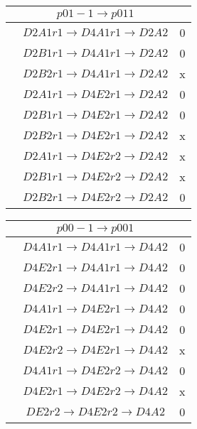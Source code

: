 \documentclass[10pt]{article}
\begin{document}
\begin{table}[!htbp]
\begin{minipage}{0.33\textwidth}
\begin{tabular}{cc c}
\hline

 &$p01-1 \rightarrow p011 $ \\ \hline
 & $D2A1 r1 \rightarrow D4A1 r1 \rightarrow D2A2$ & 0\\
 & $D2B1 r1 \rightarrow D4A1 r1 \rightarrow D2A2$ &  0\\
 & $D2B2 r1 \rightarrow D4A1 r1 \rightarrow D2A2$ &  x\\
 & $D2A1 r1 \rightarrow D4E2 r1 \rightarrow D2A2$ &  0\\
 & $D2B1 r1 \rightarrow D4E2 r1 \rightarrow D2A2$ &  0\\
 & $D2B2 r1 \rightarrow D4E2 r1 \rightarrow D2A2$ &  x\\
 & $D2A1 r1 \rightarrow D4E2 r2 \rightarrow D2A2$ &  x\\
 & $D2B1 r1 \rightarrow D4E2 r2 \rightarrow D2A2$ &  x\\
 & $D2B2 r1 \rightarrow D4E2 r2 \rightarrow D2A2$ &  0\\

\hline

\end{tabular}
\end{minipage}
\begin{minipage}[!htbp]{0.33\textwidth}
\begin{tabular}{cc c}
\centering

 &$p00-1 \rightarrow p001 $ \\ \hline
 & $D4A1 r1 \rightarrow D4A1 r1 \rightarrow D4A2$ & 0\\
 & $D4E2 r1 \rightarrow D4A1 r1 \rightarrow D4A2$ &  0\\
 & $D4E2 r2 \rightarrow D4A1 r1 \rightarrow D4A2$ &  0\\
 & $D4A1 r1 \rightarrow D4E2 r1 \rightarrow D4A2$ &  0\\
 & $D4E2 r1 \rightarrow D4E2 r1 \rightarrow D4A2$ &  0\\
 & $D4E2 r2 \rightarrow D4E2 r1 \rightarrow D4A2$ &  x\\
 & $D4A1 r1 \rightarrow D4E2 r2 \rightarrow D4A2$ &  0\\
 & $D4E2 r1 \rightarrow D4E2 r2 \rightarrow D4A2$ &  x\\
 & $DE2 r2 \rightarrow D4E2 r2 \rightarrow D4A2$ &  0\\


\hline


\end{tabular}
\end{minipage}
\end{table}
\end{document}
